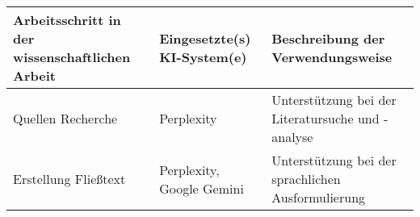 {\begin{tabular}{|p{5cm}|p{3cm}|p{7cm}|}
    \hline
    \textbf{Arbeitsschritt in der wissenschaftlichen Arbeit} &
%
%
%
    \textbf{Eingesetzte(s) KI-System(e)} & \textbf{Beschreibung der Verwendungsweise} \\
    \hline
    Quellen Recherche & Perplexity & Unterstützung bei der Literatursuche und -analyse \\ %
    \hline
    Erstellung Fließtext & Perplexity, Google Gemini & Unterstützung bei der sprachlichen Ausformulierung \\ %
    \hline
  \end{tabular}
} %
